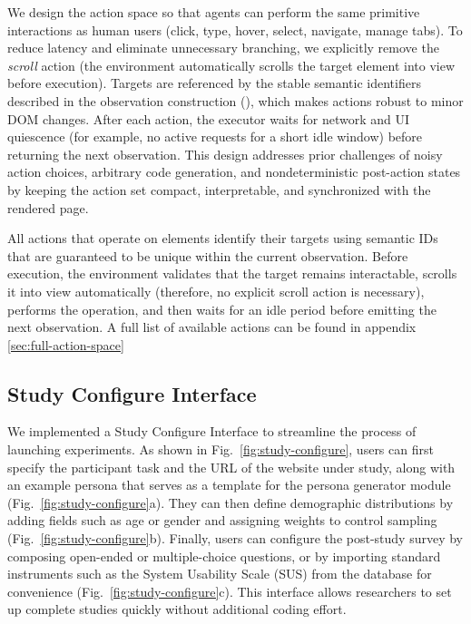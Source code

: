 \documentclass[manuscript,review,anonymous]{acmart}
\begin{document}
We design the action space so that agents can perform the same primitive interactions as human users (click, type, hover, select, navigate, manage tabs). To reduce latency and eliminate unnecessary branching, we explicitly remove the \emph{scroll} action (the environment automatically scrolls the target element into view before execution). Targets are referenced by the stable semantic identifiers described in the observation construction (), which makes actions robust to minor DOM changes. After each action, the executor waits for network and UI quiescence (for example, no active requests for a short idle window) before returning the next observation. This design addresses prior challenges of noisy action choices, arbitrary code generation, and nondeterministic post-action states by keeping the action set compact, interpretable, and synchronized with the rendered page.

All actions that operate on elements identify their targets using semantic IDs that are guaranteed to be unique within the current observation. Before execution, the environment validates that the target remains interactable, scrolls it into view automatically (therefore, no explicit scroll action is necessary), performs the operation, and then waits for an idle period before emitting the next observation. A full list of available actions can be found in appendix \ref{sec:full-action-space}




\subsection{Study Configure Interface}  
We implemented a Study Configure Interface to streamline the process of launching experiments. As shown in Fig.~\ref{fig:study-configure}, users can first specify the participant task and the URL of the website under study, along with an example persona that serves as a template for the persona generator module (Fig.~\ref{fig:study-configure}a). They can then define demographic distributions by adding fields such as age or gender and assigning weights to control sampling (Fig.~\ref{fig:study-configure}b). Finally, users can configure the post-study survey by composing open-ended or multiple-choice questions, or by importing standard instruments such as the System Usability Scale (SUS) from the database for convenience (Fig.~\ref{fig:study-configure}c). This interface allows researchers to set up complete studies quickly without additional coding effort.  
\end{document}
